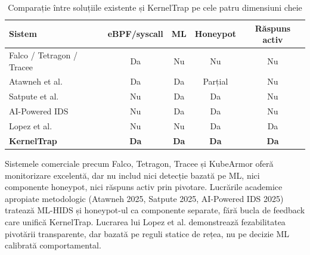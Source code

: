 \begin{table}[h]
  \centering
  \caption{Comparație între soluțiile existente și KernelTrap pe cele patru
           dimensiuni cheie}
  \label{tab:cap3-comparatie}
  \renewcommand{\arraystretch}{1.08}
  \begin{tabular}{|l|c|c|c|c|}
    \hline
    \textbf{Sistem} & \textbf{eBPF/syscall} & \textbf{ML} &
    \textbf{Honeypot} & \textbf{Răspuns activ} \\
    \hline\hline
    Falco / Tetragon / Tracee                        & Da  & Nu  & Nu      & Nu  \\
    \hline
    Atawneh et al.~\cite{atawneh2025symmetry}        & Da  & Da  & Parțial & Nu  \\
    \hline
    Satpute et al.~\cite{satpute2025aidriven}        & Nu  & Da  & Da      & Nu  \\
    \hline
    AI-Powered IDS~\cite{aipoweredids2025}           & Nu  & Da  & Da      & Nu  \\
    \hline
    Lopez et al.~\cite{lopez2024tcpredirection}      & Nu  & Nu  & Da      & Da  \\
    \hline
    \textbf{KernelTrap}                              & \textbf{Da} & \textbf{Da} &
    \textbf{Da} & \textbf{Da} \\
    \hline
  \end{tabular}
\end{table}

Sistemele comerciale precum Falco, Tetragon, Tracee și KubeArmor oferă
monitorizare excelentă, dar nu includ nici detecție bazată pe ML, nici
componente honeypot, nici răspuns activ prin pivotare.
Lucrările academice apropiate metodologic (Atawneh 2025, Satpute 2025,
AI-Powered IDS 2025) tratează ML-HIDS și honeypot-ul ca componente separate,
fără bucla de feedback care unifică KernelTrap.
Lucrarea lui Lopez et al. demonstrează fezabilitatea pivotării transparente,
dar bazată pe reguli statice de rețea, nu pe decizie ML calibrată
comportamental.

